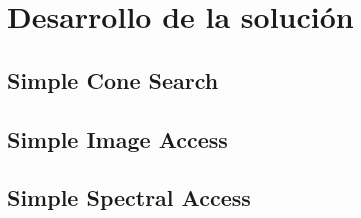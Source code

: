 \section{Desarrollo de la solución}

\subsection{Simple Cone Search}

\subsection{Simple Image Access}

\subsection{Simple Spectral Access}
